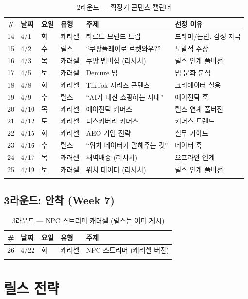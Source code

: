 \documentclass[11pt, a4paper]{article}
\begin{document}
\begin{longtable}{c l l l p{4.5cm} p{4cm}}
\toprule
\textbf{\#} & \textbf{날짜} & \textbf{요일} & \textbf{유형} & \textbf{주제} & \textbf{선정 이유} \\
\midrule
\endhead
14 & 4/1 & 화 & 캐러셀 & 타르트 브랜드 트립 & 드라마/논란. 감정 자극 \\
15 & 4/2 & 수 & 릴스 & ``쿠팡플레이로 로켓와우?'' & 도발적 주장 \\
16 & 4/3 & 목 & 캐러셀 & 쿠팡 멤버십 (리서치) & 릴스 연계 풀버전 \\
17 & 4/5 & 토 & 캐러셀 & Demure 밈 & 밈 문화 분석 \\
\midrule
18 & 4/8 & 화 & 캐러셀 & TikTok 시리즈 콘텐츠 & 크리에이터 실용 \\
19 & 4/9 & 수 & 릴스 & ``AI가 대신 쇼핑하는 시대'' & 에이전틱 훅 \\
20 & 4/10 & 목 & 캐러셀 & 에이전틱 커머스 & 릴스 연계 풀버전 \\
21 & 4/12 & 토 & 캐러셀 & 디스커버리 커머스 & 커머스 트렌드 \\
\midrule
22 & 4/15 & 화 & 캐러셀 & AEO 기업 전략 & 실무 가이드 \\
23 & 4/16 & 수 & 릴스 & ``위치 데이터가 말해주는 것'' & 데이터 훅 \\
24 & 4/17 & 목 & 캐러셀 & 새벽배송 (리서치) & 오프라인 연계 \\
25 & 4/19 & 토 & 캐러셀 & 위치 데이터 (리서치) & 릴스 연계 풀버전 \\
\bottomrule
\caption{2라운드 — 확장기 콘텐츠 캘린더}
\end{longtable}

\subsection{3라운드: 안착 (Week 7)}

\begin{longtable}{c l l l p{5cm}}
\toprule
\textbf{\#} & \textbf{날짜} & \textbf{요일} & \textbf{유형} & \textbf{주제} \\
\midrule
26 & 4/22 & 화 & 캐러셀 & NPC 스트리머 (캐러셀 버전) \\
\bottomrule
\caption{3라운드 — NPC 스트리머 캐러셀 (릴스는 이미 게시)}
\end{longtable}


\section{릴스 전략}
\end{document}
